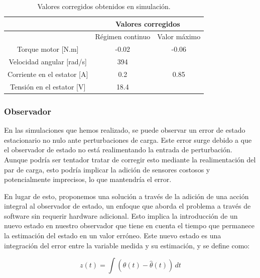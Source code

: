 \documentclass{article}
\begin{document}
\begin{table}[H]
    \begin{center}
    \begin{tabular}{|c|c|c|}
        \hline
         & \multicolumn{2}{c|}{Valores corregidos} \\
        \hline
          & Régimen continuo & Valor máximo \\
        \hline
        Torque motor [N.m]  & -0.02 & -0.06 \\
        \hline
        Velocidad angular [rad/s] & 394 &  \\
        \hline
        Corriente en el estator [A] & 0.2 & 0.85 \\
        \hline
        Tensión en el estator [V]  & 18.4 &\\
        \hline
    \end{tabular}
\end{center}
\caption{Valores corregidos obtenidos en simulación.}
\end{table}


\subsubsection{Observador}

En las simulaciones que hemos realizado, se puede observar un error de estado estacionario no nulo 
ante perturbaciones de carga. Este error surge debido a que el observador de estado no está 
realimentando la entrada de perturbación. Aunque podría ser tentador tratar de corregir esto 
mediante la realimentación del par de carga, esto podría implicar la adición de sensores costosos 
y potencialmente imprecisos, lo que mantendría el error.

En lugar de esto, proponemos una solución a través de la adición de una acción integral al 
observador de estado, un enfoque que aborda el problema a través de software sin requerir hardware 
adicional. Esto implica la introducción de un nuevo estado en nuestro observador que tiene en 
cuenta el tiempo que permanece la estimación del estado en un valor erróneo. Este nuevo estado es 
una integración del error entre la variable medida y su estimación, y se define como:

\begin{equation}
    z(t) = \int (\theta(t) - \hat{\theta}(t))\,dt
\end{equation}
\end{document}
